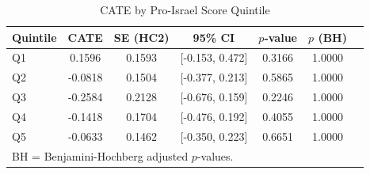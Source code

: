 \begin{table}[htbp]
\centering
\caption{CATE by Pro-Israel Score Quintile}
\label{tab:cate}
\begin{tabular}{lcccccc}
\hline\hline
Quintile & CATE & SE (HC2) & 95\% CI & $p$-value & $p$ (BH) \\
\hline
Q1 & 0.1596 & 0.1593 & [-0.153, 0.472] & 0.3166 & 1.0000 \\
Q2 & -0.0818 & 0.1504 & [-0.377, 0.213] & 0.5865 & 1.0000 \\
Q3 & -0.2584 & 0.2128 & [-0.676, 0.159] & 0.2246 & 1.0000 \\
Q4 & -0.1418 & 0.1704 & [-0.476, 0.192] & 0.4055 & 1.0000 \\
Q5 & -0.0633 & 0.1462 & [-0.350, 0.223] & 0.6651 & 1.0000 \\
\hline\hline
\multicolumn{6}{l}{\footnotesize BH = Benjamini-Hochberg adjusted $p$-values.} \\
\end{tabular}
\end{table}
